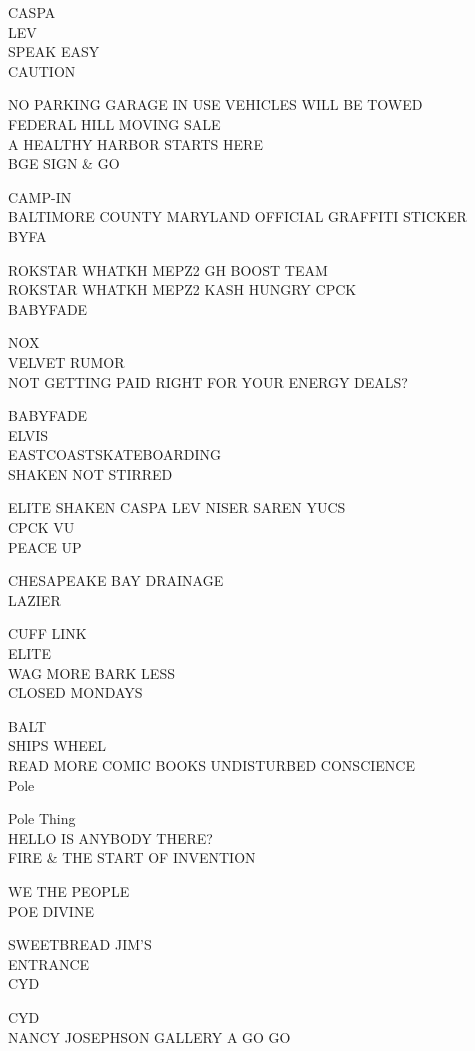 \documentclass[10pt,letterpaper]{article}
\begin{document}
CASPA\\
LEV\\
SPEAK EASY\\
CAUTION

NO PARKING GARAGE IN USE VEHICLES WILL BE TOWED\\
FEDERAL HILL MOVING SALE\\
A HEALTHY HARBOR STARTS HERE\\
BGE SIGN \& GO

CAMP{-}IN\\
BALTIMORE COUNTY MARYLAND OFFICIAL GRAFFITI STICKER\\
BYFA

ROKSTAR WHATKH MEPZ2 GH BOOST TEAM\\
ROKSTAR WHATKH MEPZ2 KASH HUNGRY CPCK\\
BABYFADE

NOX\\
VELVET RUMOR\\
NOT GETTING PAID RIGHT FOR YOUR ENERGY DEALS?

BABYFADE\\
ELVIS\\
EASTCOASTSKATEBOARDING\\
SHAKEN NOT STIRRED

ELITE SHAKEN CASPA LEV NISER SAREN YUCS\\
CPCK VU\\
PEACE UP

CHESAPEAKE BAY DRAINAGE\\
LAZIER

CUFF LINK\\
ELITE\\
WAG MORE BARK LESS\\
CLOSED MONDAYS

BALT\\
SHIPS WHEEL\\
READ MORE COMIC BOOKS UNDISTURBED CONSCIENCE\\
Pole

Pole Thing\\
HELLO IS ANYBODY THERE?\\
FIRE \& THE START OF INVENTION

WE THE PEOPLE\\
POE DIVINE

SWEETBREAD JIM'S\\
ENTRANCE\\
CYD

CYD\\
NANCY JOSEPHSON GALLERY A GO GO
\end{document}
